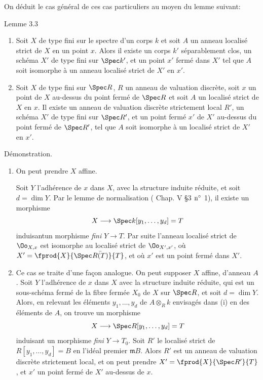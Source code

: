 \documentclass[10pt]{../fichiers-configuration-latex/smfart}
\begin{document}
On déduit le cas général de ces cas particuliers au moyen du lemme
suivant:

\begin{enonce*}{Lemme 3.3}
\begin{enumerate}
\renewcommand{\theenumi}{\roman{enumi}}
\renewcommand{\labelenumi}{(\theenumi)}
\item Soit $X$ de type fini sur le spectre d'un corps $k$ et soit $A$
  un anneau localisé strict de $X$ en un point $x$. Alors il existe un
  corps $k'$ séparablement clos, un schéma $X'$ de type fini sur
  $\Spec k'$, et un point $x'$ fermé dans $X'$ tel que $A$ soit
  isomorphe à un anneau localisé strict de $X'$ en $x'$.

\item Soit $X$ de type fini sur $\Spec R$, $R$ un anneau de valuation
  discrète, soit $x$ un point de $X$ au-dessus du point fermé de
  $\Spec R$ et soit $A$ un localisé strict de $X$ en $x$. Il existe un
  anneau de valuation discrète strictement local $R'$, un schéma $X'$
  de type fini sur $\Spec R'$, et un point fermé $x'$ de $X'$
  au-dessus du point fermé de $\Spec R'$, tel que $A$ soit isomorphe à
  un localisé strict de $X'$ en $x'$.
\end{enumerate}
\end{enonce*}

Démonstration. 
\begin{enumerate}
\renewcommand{\theenumi}{\roman{enumi}}
\renewcommand{\labelenumi}{(\theenumi)}
\item On peut prendre $X$ affine. 

Soit $Y$ l'adhérence de
$x$ dans $X$, avec la structure induite réduite, et soit $d=\dim
Y$. Par le lemme de normalisation (\cite{2} Chap. V \S 3 ${\rm n^{\circ}}$
1), il existe un morphisme
$$
X\longrightarrow \Spec k[y_1,\ldots, y_d]=T
$$
induisant\pageoriginale un morphisme \emph{fini} $Y\rightarrow T$. Par
suite l'anneau localisé strict de $\Oo_{X,x}$ est isomorphe au localisé
strict de $\Oo_{X',x'}$, où $X'=\fprod{X}{\Spec\bar{R(T)}}{T}$, et où
$x'$ est un point fermé dans $X'$.

\item Ce cas se traite d'une façon analogue. On peut supposer $X$
  affine, d'anneau $A$. Soit $Y$ l'adhérence de $x$ dans $X$ avec la
  structure induite réduite, qui est un sous-schéma fermé de la fibre
  fermée $X_0$ de $X$ sur $\Spec R$, et soit $d=\dim Y$. Alors, en
  relevant les éléments $y_1,\ldots,y_d$ de $A\otimes_R k$ envisagés
  dans (i) en des éléments de $A$, on trouve un morphisme
$$
X\longrightarrow \Spec R[y_1,\ldots,y_d]=T
$$
induisant un morphisme \emph{fini} $Y\rightarrow T_0$. Soit $R'$ le
localisé strict de $R[y_1,\ldots,y_d]=B$ en l'idéal premier
$𝔪B$. %
Alors $R'$ est un anneau de valuation discrète strictement
local, et on peut prendre $X'=\fprod{X}{\Spec R'}{T}$, et $x'$ un
point fermé de $X'$ au-dessus de $x$.
\end{enumerate}
\end{document}
